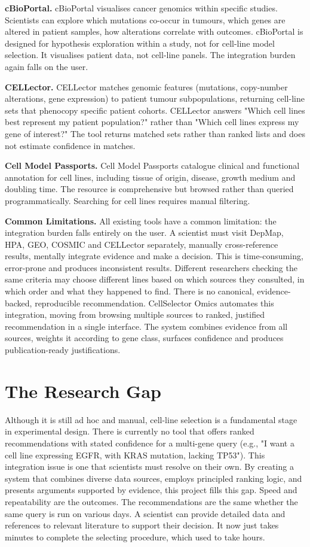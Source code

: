 \documentclass[author={Karen Coutinho, Ishaan Bhalla, Aman Raj, Dixit Kaloorani Malarmannan},
                supervisor={Dr. Daniel D'Andrea},
                degree={MSc},
                title={CellSelector Omics: A Multi-Omics Recommendation System for Cell Line Selection},
                subtitle={},
                type={},
                year={2026}]{dissertation}
\begin{document}
{\bf cBioPortal.} cBioPortal \cite{gao2013cbioportal} visualises cancer genomics within specific studies. Scientists can explore which mutations co-occur in tumours, which genes are altered in patient samples, how alterations correlate with outcomes. cBioPortal is designed for hypothesis exploration within a study, not for cell-line model selection. It visualises patient data, not cell-line panels. The integration burden again falls on the user.

{\bf CELLector.} CELLector \cite{iorio2016cellector} matches genomic features (mutations, copy-number alterations, gene expression) to patient tumour subpopulations, returning cell-line sets that phenocopy specific patient cohorts. CELLector answers "Which cell lines best represent my patient population?" rather than "Which cell lines express my gene of interest?" The tool returns matched sets rather than ranked lists and does not estimate confidence in matches.

{\bf Cell Model Passports.} Cell Model Passports catalogue clinical and functional annotation for cell lines, including tissue of origin, disease, growth medium and doubling time. The resource is comprehensive but browsed rather than queried programmatically. Searching for cell lines requires manual filtering.

{\bf Common Limitations.} All existing tools have a common limitation: the integration burden falls entirely on the user. A scientist must visit DepMap, HPA, GEO, COSMIC and CELLector separately, manually cross-reference results, mentally integrate evidence and make a decision. This is time-consuming, error-prone and produces inconsistent results. Different researchers checking the same criteria may choose different lines based on which sources they consulted, in which order and what they happened to find. There is no canonical, evidence-backed, reproducible recommendation. CellSelector Omics automates this integration, moving from browsing multiple sources to ranked, justified recommendation in a single interface. The system combines evidence from all sources, weights it according to gene class, surfaces confidence and produces publication-ready justifications.

\section{The Research Gap}

Although it is still ad hoc and manual, cell-line selection is a fundamental stage in experimental design. There is currently no tool that offers ranked recommendations with stated confidence for a multi-gene query (e.g., "I want a cell line expressing EGFR, with KRAS mutation, lacking TP53"). This integration issue is one that scientists must resolve on their own. By creating a system that combines diverse data sources, employs principled ranking logic, and presents arguments supported by evidence, this project fills this gap. Speed and repeatability are the outcomes. The recommendations are the same whether the same query is run on various days. A scientist can provide detailed data and references to relevant literature to support their decision. It now just takes minutes to complete the selecting procedure, which used to take hours.
\end{document}
